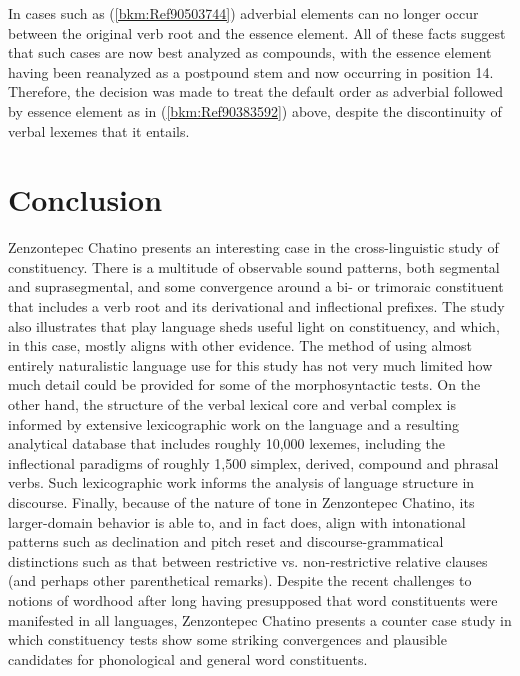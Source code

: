 \documentclass[output=paper]{langscibook}
\begin{document}
In cases such as (\ref{bkm:Ref90503744}) adverbial elements can no longer occur between the original verb root and the essence element. All of these facts suggest that such cases are now best analyzed as compounds, with the essence element having been reanalyzed as a postpound stem and now occurring in position 14. Therefore, the decision was made to treat the default order as adverbial followed by essence element as in (\ref{bkm:Ref90383592}) above, despite the discontinuity of verbal lexemes that it entails. 

\section{Conclusion}
\label{bkm:Ref113366717}
Zenzontepec Chatino presents an interesting case in the cross-linguistic study of constituency. There is a multitude of observable sound patterns, both segmental and suprasegmental, and some convergence around a bi- or trimoraic constituent that includes a verb root and its derivational and inflectional prefixes. The study also illustrates that play language sheds useful light on constituency, and which, in this case, mostly aligns with other evidence. The method of using almost entirely naturalistic language use for this study has not very much limited how much detail could be provided for some of the morphosyntactic tests. On the other hand, the structure of the verbal lexical core and verbal complex is informed by extensive lexicographic work on the language and a resulting analytical database that includes roughly 10,000 lexemes, including the inflectional paradigms of roughly 1,500 simplex, derived, compound and phrasal verbs. Such lexicographic work informs the analysis of language structure in discourse. Finally, because of the nature of tone in Zenzontepec Chatino, its larger-domain behavior is able to, and in fact does, align with intonational patterns such as declination and pitch reset and discourse-grammatical distinctions such as that between restrictive vs. non-restrictive relative clauses (and perhaps other parenthetical remarks). Despite the recent challenges to notions of wordhood after long having presupposed that word constituents were manifested in all languages, Zenzontepec Chatino presents a counter case study in which constituency tests show some striking convergences and plausible candidates for phonological and general word constituents.
\end{document}
